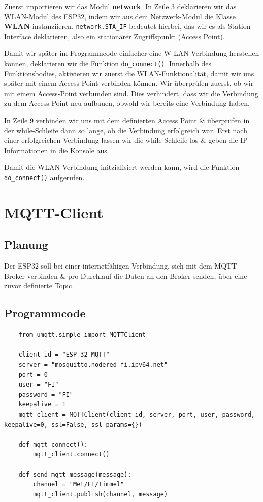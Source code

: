 \documentclass[9pt,a4paper]{report}
\begin{document}
	Zuerst importieren wir das Modul \textbf{network}.
	In Zeile 3 deklarieren wir das WLAN-Modul des ESP32, indem wir aus dem Netzwerk-Modul die Klasse \textbf{WLAN} instanziieren. \texttt{network.STA\_IF} bedeutet hierbei, das wir es als Station Interface deklarieren, also ein stationärer Zugriffspunkt (Access Point).
	
	Damit wir später im Programmcode einfacher eine W-LAN Verbindung herstellen können, deklarieren wir die Funktion \texttt{do\_connect()}. Innerhalb des Funktionsbodies, aktivieren wir zuerst die WLAN-Funktionalität, damit wir uns später mit einem Access Point verbinden können. Wir überprüfen zuerst, ob wir mit einem Access-Point verbunden sind. Dies verhindert, dass wir die Verbindung zu dem Access-Point neu aufbauen, obwohl wir bereits eine Verbindung haben.
	
	In Zeile 9 verbinden wir uns mit dem definierten Access Point \& überprüfen in der while-Schleife dann so lange, ob die Verbindung erfolgreich war. Erst nach einer erfolgreichen Verbindung lassen wir die while-Schleife los \& geben die IP-Informationen in die Konsole aus.
	
	Damit die WLAN Verbindung initzialisiert werden kann, wird die Funktion \texttt{do\_connect()} aufgerufen.
	
	\chapter{MQTT-Client}
	
	\section{Planung}
	Der ESP32 soll bei einer internetfähigen Verbindung, sich mit dem MQTT-Broker verbinden \& pro Durchlauf die Daten an den Broker senden, über eine zuvor definierte Topic.
	
	\section{Programmcode}
	
	\begin{lstlisting}
	from umqtt.simple import MQTTClient
	
	client_id = "ESP_32_MQTT"
	server = "mosquitto.nodered-fi.ipv64.net"
	port = 0
	user = "FI"
	password = "FI"
	keepalive = 1
	mqtt_client = MQTTClient(client_id, server, port, user, password, keepalive=0, ssl=False, ssl_params={})
	
	def mqtt_connect():
		mqtt_client.connect()
		
	def send_mqtt_message(message):
		channel = "Met/FI/Timmel"
		mqtt_client.publish(channel, message)
	\end{lstlisting} 
	
\end{document}
